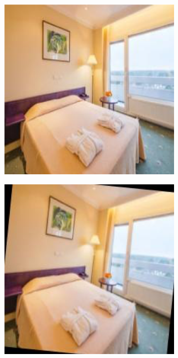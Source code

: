 \begin{figure}
\centering
   \begin{subfigure}[b]{.19\columnwidth}
        \centering
        \includegraphics[width=.98\columnwidth]{figures/chapter5/data_augmentation/1.png}
        \caption{}
    \end{subfigure}
   \begin{subfigure}[b]{.19\columnwidth}
        \centering
        \includegraphics[width=.98\columnwidth]{figures/chapter5/data_augmentation/2.png}

\end{subfigure}
\end{figure}
